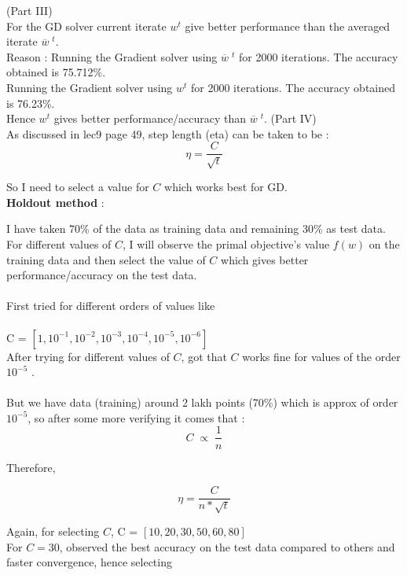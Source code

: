 \documentclass[a4paper,11pt]{article}
\begin{document}
\begin{mlsolution}
(Part III)\\

For the GD solver current iterate $w^{t}$ give better performance than the averaged iterate $\overline{w}\;^t$.\\

Reason : Running the Gradient solver using $\overline{w}\;^t$ for 2000 iterations. The accuracy obtained is 75.712\;\%.\\

Running the Gradient solver using $w^{t}$ for 2000 iterations. The accuracy obtained is 76.23\;\%.\\

Hence $w^{t}$ gives better performance/accuracy than $\overline{w}\;^t$.
\newpage
(Part IV)\\

As discussed in lec9 page 49, step length (eta) can be taken to be :
\[
\eta = \frac{C}{\sqrt{t}}
\]

So I need to select a value for $C$ which works best for GD.\\

\textbf{Holdout method} :

I have taken 70\;\% of the data as training data and remaining 30\;\% as test data. For different values of $C$, I will observe the primal objective's value $f(w)$ on the training data and then select the value of $C$ which gives better performance/accuracy on the test data.\\\\
First tried for different orders of values like \\\\
C = $ [1, 10^{-1}, 10^{-2}, 10^{-3}, 10^{-4}, 10^{-5}, 10^{-6}] $\\
After trying for different values of $C$, got that $C$ works fine for values of the order $10^{-5}$ .\\\\
But we have data (training) around 2 lakh points (70\;\%) which is approx of order $10^{-5}$, so after some more verifying it comes that :
\[
C\; \propto \;\frac{1}{n}
\]

Therefore, 

\[
\eta = \frac{C}{n*\sqrt{t}}
\]

Again, for selecting $C$, 
C = $ [10, 20, 30, 50, 60, 80] $\\

For $C = 30$, observed the best accuracy on the test data compared to others and faster convergence, hence selecting 


\end{mlsolution}
\end{document}
